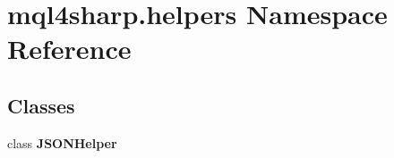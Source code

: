 \hypertarget{namespacemql4sharp_1_1helpers}{}\section{mql4sharp.\+helpers Namespace Reference}
\label{namespacemql4sharp_1_1helpers}
\subsection*{Classes}
\begin{DoxyCompactItemize}
\item 
class {\bfseries J\+S\+O\+N\+Helper}
\end{DoxyCompactItemize}
